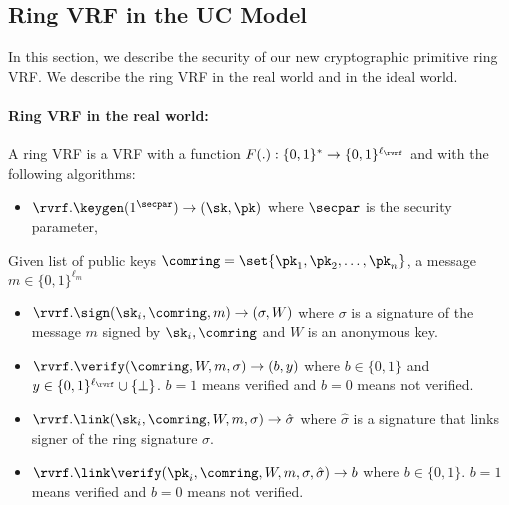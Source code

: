 \subsection{Ring VRF in the UC Model}


In this section, we describe the security of our new cryptographic primitive ring VRF. We describe the  ring VRF in the real world and in the ideal world. 

\paragraph{Ring VRF in the real world:}
\begin{definition}\label{def:ringvrf}
	A ring VRF is a VRF with a  function $ F(.):\{0,1\}^* \rightarrow \{0,1\}^{\ell_\rvrf} $ and with the following algorithms:
	
	\begin{itemize}
		\item $ \rvrf.\keygen(1^\secpar) \rightarrow (\sk,\pk)$ where $ \secpar $ is the security parameter,
	\end{itemize}
	Given list of public keys $ \comring = \set{\pk_1, \pk_2, \ldots, \pk_n}$, a message $ m \in \{0,1\}^{\ell_m} $
	\begin{itemize}
		\item $ \rvrf.\sign(\sk_i, \comring, m)\rightarrow (\sigma,W) $ where  $\sigma $ is a signature of the message $ m $ signed by $ \sk_i, \comring $ and $ W $ is an anonymous key.
		\item $ \rvrf.\verify(\comring,W, m,\sigma) \rightarrow  (b, y)$ where $ b \in \{0,1\} $ and $ y \in \{0,1\}^{\ell_\rvrf}\cup \{\perp\} $. $ b =1 $ means verified and $ b = 0 $ means not verified.
		\item $ \rvrf.\link(\sk_i, \comring,W,m, \sigma) \rightarrow \hat\sigma $ where  $ \hat\sigma $ is a signature that links signer of the ring signature $ \sigma $. 
		\item $ \rvrf.\link\verify( \pk_i,\comring,W, m, \sigma, \hat\sigma)\rightarrow b$ where $ b \in \{0,1\} $. $ b =1 $ means verified and $ b = 0 $ means not verified.
	\end{itemize}
\end{definition}

